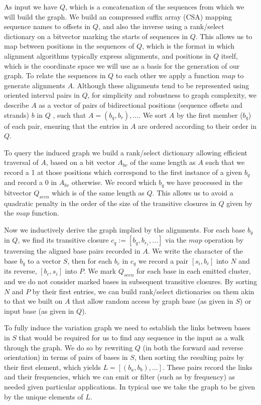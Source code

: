 As input we have $Q$, which is a concatenation of the sequences from which we will build the graph.
We build an compressed suffix array (CSA) mapping sequence names to offsets in $Q$, and also the inverse using a rank/select dictionary on a bitvector marking the starts of sequences in $Q$.
This allows us to map between positions in the sequences of $Q$, which is the format in which alignment algorithms typically express alignments, and positions in $Q$ itself, which is the coordinate space we will use as a basis for the generation of our graph.
To relate the sequences in $Q$ to each other we apply a function $map$ to generate alignments $A$.
Although these alignments tend to be represented using oriented interval pairs in $Q$, for simplicity and robustness to graph complexity, we describe $A$ as a vector of pairs of bidirectional positions (sequence offsets and strands) $b$ in $Q$ , such that $A = (b_{q}, b_{r}), \ldots $.
We sort $A$ by the first member ($b_{q}$) of each pair, ensuring that the entries in $A$ are ordered according to their order in $Q$.

To query the induced graph we build a rank/select dictionary allowing efficient traversal of $A$, based on a bit vector $A_{bv}$ of the same length as $A$ such that we record a 1 at those positions which correspond to the first instance of a given $b_{q}$ and record a 0 in $A_{bv}$ otherwise. 
We record which $b_{q}$ we have processed in the bitvector $Q_{seen}$ which is of the same length as $Q$.
This allows us to avoid a quadratic penalty in the order of the size of the transitive closures in $Q$ given by the $map$ function.

Now we inductively derive the graph implied by the alignments.
For each base $b_{q}$ in $Q$, we find its transitive closure $c_{q} := [b_{q}, b_{r_{1}}, \ldots ]$ via the $map$ operation by traversing the aligned base pairs recorded in $A$.
We write the character of the base $b_{q}$ to a vector $S$, then for each $b_{c}$ in $c_{q}$ we record a pair $[s_{i}, b_{c}]$ into $N$ and its reverse, $[b_{c}, s_{i}]$ into $P$.
We mark $Q_{seen}$ for each base in each emitted cluster, and we do not consider marked bases in subsequent transitive closures.
By sorting $N$ and $P$ by their first entries, we can build rank/select dictionaries on them akin to that we built on $A$ that allow random access by graph base (as given in $S$) or input base (as given in $Q$).

To fully induce the variation graph we need to establish the links between bases in $S$ that would be required for us to find any sequence in the input as a walk through the graph.
We do so by rewriting $Q$ (in both the forward and reverse orientation) in terms of pairs of bases in $S$, then sorting the resulting pairs by their first element, which yields $L = [(b_{a}, b_{b}), \ldots ]$.
These pairs record the links and their frequencies, which we can emit or filter (such as by frequency) as needed given particular applications.
In typical use we take the graph to be given by the unique elements of $L$.

